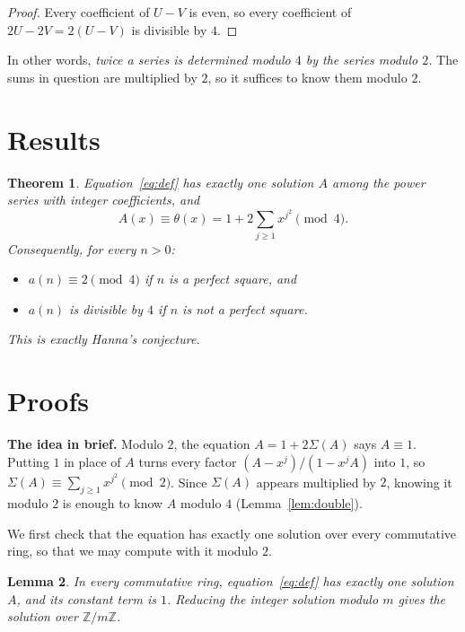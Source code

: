 \documentclass[11pt,a4paper]{article}
\newtheorem{theorem}{Theorem}[section]
\newtheorem{lemma}[theorem]{Lemma}
\theoremstyle{definition}
\theoremstyle{remark}
\newcommand{\Z}{\mathbb{Z}}
\newcommand{\para}[1]{\par\medskip\noindent\textbf{#1}\enspace}
\begin{document}
\begin{proof}
Every coefficient of $U-V$ is even, so every coefficient of $2U-2V=2(U-V)$ is divisible by $4$.
\end{proof}
In other words, \emph{twice a series is determined modulo $4$ by the series modulo $2$.} The sums in question are
multiplied by $2$, so it suffices to know them modulo $2$.

\section{Results}\label{sec:results}

\begin{theorem}\label{thm:main}
Equation~\eqref{eq:def} has exactly one solution $A$ among the power series with integer coefficients, and
\[
A(x)\equiv\theta(x)=1+2\sum_{j\ge1}x^{j^2}\pmod 4 .
\]
Consequently, for every $n>0$:
\begin{itemize}
\item $a(n)\equiv2\pmod 4$ if $n$ is a perfect square, and
\item $a(n)$ is divisible by $4$ if $n$ is not a perfect square.
\end{itemize}
This is exactly Hanna's conjecture.
\end{theorem}

\section{Proofs}\label{sec:proofs}

\para{The idea in brief.} Modulo $2$, the equation $A=1+2\Sigma(A)$ says $A\equiv1$. Putting $1$ in place of $A$ turns every factor
$(A-x^j)/(1-x^jA)$ into $1$, so $\Sigma(A)\equiv\sum_{j\ge1}x^{j^2}\pmod2$. Since $\Sigma(A)$ appears multiplied by
$2$, knowing it modulo $2$ is enough to know $A$ modulo $4$ (Lemma~\ref{lem:double}).

We first check that the equation has exactly one solution over every commutative ring, so that we may compute with it
modulo $2$.

\begin{lemma}\label{lem:exist}
In every commutative ring, equation~\eqref{eq:def} has exactly one solution $A$, and its constant term is $1$.
Reducing the integer solution modulo $m$ gives the solution over $\Z/m\Z$.
\end{lemma}
\end{document}
